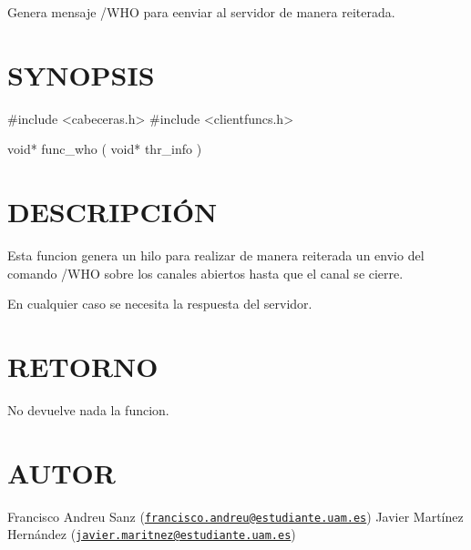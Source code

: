 Genera mensaje /\-W\-H\-O para eenviar al servidor de manera reiterada.\hypertarget{ServerReply_SYNOPSIS}{}\section{S\-Y\-N\-O\-P\-S\-I\-S}\label{ServerReply_SYNOPSIS}
\begin{DoxyVerb} #include  <cabeceras.h>
   #include  <clientfuncs.h>

 void* func_who ( void* thr_info )
\end{DoxyVerb}
\hypertarget{ServerReply_descripcion}{}\section{D\-E\-S\-C\-R\-I\-P\-C\-IÓ\-N}\label{ServerReply_descripcion}
Esta funcion genera un hilo para realizar de manera reiterada un envio del comando /\-W\-H\-O sobre los canales abiertos hasta que el canal se cierre.

En cualquier caso se necesita la respuesta del servidor.\hypertarget{ServerReply_retorno}{}\section{R\-E\-T\-O\-R\-N\-O}\label{ServerReply_retorno}
No devuelve nada la funcion.\hypertarget{ServerReply_authors}{}\section{A\-U\-T\-O\-R}\label{ServerReply_authors}
Francisco Andreu Sanz (\href{mailto:francisco.andreu@estudiante.uam.es}{\tt francisco.\-andreu@estudiante.\-uam.\-es}) Javier Martínez Hernández (\href{mailto:javier.maritnez@estudiante.uam.es}{\tt javier.\-maritnez@estudiante.\-uam.\-es}) 

 